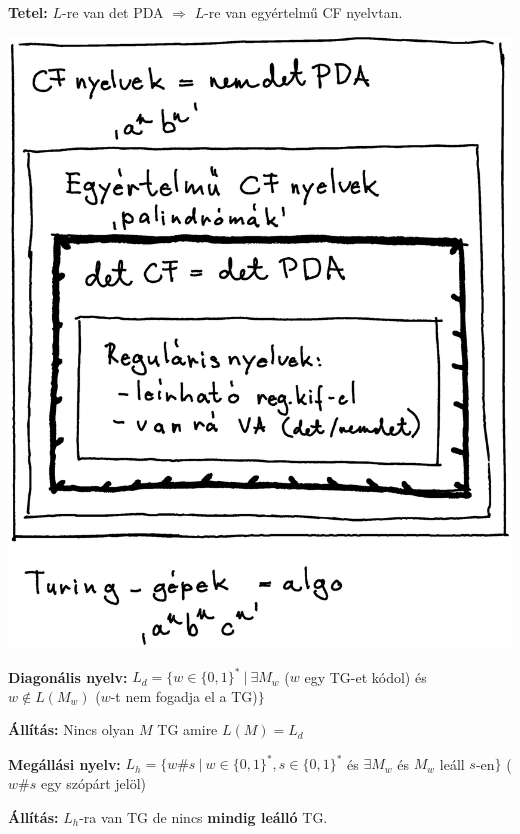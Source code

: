 \documentclass[a4paper]{article}
\begin{document}
\begin{tcolorbox}[size = fbox]
  \textbf{Tetel:} $L$-re van det PDA $\Rightarrow$ $L$-re van egyértelmű CF nyelvtan.
\end{tcolorbox}

\begin{center}
  \includegraphics[scale=0.2]{images/image-1}
\end{center}

\begin{tcolorbox}[size = fbox]
  \textbf{Diagonális nyelv:} $L_d = \{ w \in \{0,1\}^*\ |\ \exists M_w $ ($w$ egy TG-et kódol) és $w \notin L(M_w)$ ($w$-t nem fogadja el a TG)$\}$ 
\end{tcolorbox}

\begin{tcolorbox}[size = fbox]
  \textbf{Állítás:} Nincs olyan $M$ TG amire $L(M) = L_d$
\end{tcolorbox}

\begin{tcolorbox}[size = fbox]
  \textbf{Megállási nyelv:} $L_h = \{ w\#s \ |\ w \in \{0,1\}^*, s \in \{0,1\}^*$ és $\exists M_w$ és $M_w$ leáll $s$-en$\}$ ($w\#s$ egy szópárt jelöl)
\end{tcolorbox}

\begin{tcolorbox}[size = fbox]
  \textbf{Állítás:} $L_h$-ra van TG de nincs \textbf{mindig leálló} TG.
\end{tcolorbox}
\end{document}
